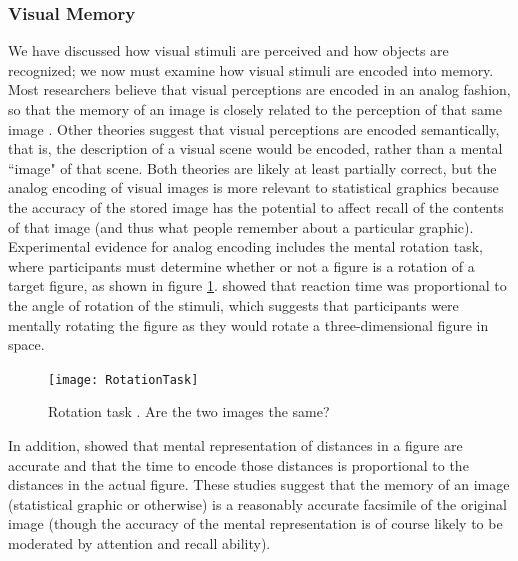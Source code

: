 \documentclass[11pt]{isuthesis}\usepackage[]{graphicx}\usepackage[]{color}
\begin{document}
\subsubsection{Visual Memory}
We have discussed how visual stimuli are perceived and how objects are recognized; we now must examine how visual stimuli are encoded into memory. Most researchers believe that visual perceptions are encoded in an analog fashion, so that the memory of an image is closely related to the perception of that same image \citep{cognition}. Other theories suggest that visual perceptions are encoded semantically, that is, the description of a visual scene would be encoded, rather than a mental ``image" of that scene. Both theories are likely at least partially correct, but the analog encoding of visual images is more relevant to statistical graphics because the accuracy of the stored image has the potential to affect recall of the contents of that image (and thus what people remember about a particular graphic). Experimental evidence for analog encoding includes the mental rotation task, where participants must determine whether or not a figure is a rotation of a target figure, as shown in figure \ref{fig:mentalRotation}. \citet{shepard1988mental} showed that reaction time was proportional to the angle of rotation of the stimuli, which suggests that participants were mentally rotating the figure as they would rotate a three-dimensional figure in space. 

\begin{figure}[htbp]\centering
\texttt{[image: RotationTask]}
\caption[Rotation task]{Rotation task \protect\citep{shepard1988mental}. Are the two images the same?}\label{fig:mentalRotation}
\end{figure}

In addition, \citet{kosslyn1978visual} showed that mental representation of distances in a figure are accurate and that the time to encode those distances is proportional to the distances in the actual figure. These studies suggest that the memory of an image (statistical graphic or otherwise) is a reasonably accurate facsimile of the original image (though the accuracy of the mental representation is of course likely to be moderated by attention and recall ability). 
\end{document}
